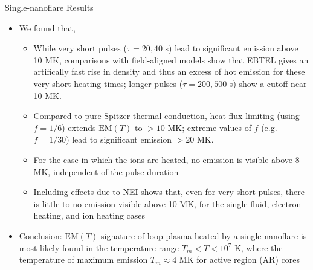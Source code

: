 \documentclass[final]{beamer}
\begin{document}
\begin{frame}
\begin{columns}[T]
\begin{column}{0.49\linewidth}
\begin{block}{Single-nanoflare Results}
\begin{itemize}
        \item We found that,
        \begin{itemize}
          \item While very short pulses ($\tau=20,40$ s) lead to significant emission above 10 MK, comparisons with field-aligned models \citep[e.g. HYDRAD,][]{bradshaw_influence_2013} show that EBTEL gives an artifically fast rise in density and thus an excess of hot emission for these very short heating times; longer pulses ($\tau=200,500$ s) show a cutoff near 10 MK.
          \item Compared to pure Spitzer thermal conduction, heat flux limiting (using $f=1/6$) extends $\mathrm{EM}(T)$ to $>10$ MK; extreme values of $f$ (e.g. $f=1/30$) lead to significant emission $>20$ MK.
          \item For the case in which the ions are heated, no emission is visible above 8 MK, independent of the pulse duration
          \item Including effects due to NEI shows that, even for very short pulses, there is little to no emission visible above 10 MK, for the single-fluid, electron heating, and ion heating cases
        \end{itemize}
        \item Conclusion: \alert{$\mathrm{EM}(T)$ signature of loop plasma heated by a single nanoflare is most likely found in the temperature range $T_m<T<10^7$ K}, where the temperature of maximum emission $T_m\approx4$ MK for active region (AR) cores \citep{warren_systematic_2012}
      \end{itemize}
      \vspace{-1ex}
      \begin{figure}
\end{figure}
\end{block}
\end{column}
\end{columns}
\end{frame}
\end{document}
